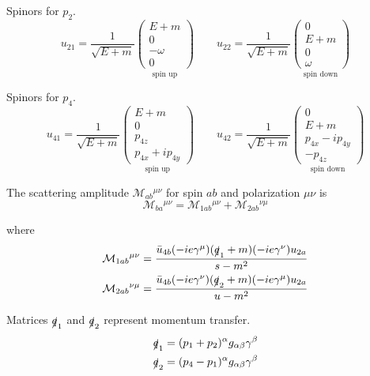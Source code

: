 Spinors for $p_2$.
\begin{equation*}
u_{21}=\frac{1}{\sqrt{E+m}}
\underset{\text{spin up}}
{\begin{pmatrix}
E+m\\
0\\
-\omega\\
0
\end{pmatrix}}
\qquad
u_{22}=\frac{1}{\sqrt{E+m}}
\underset{\text{spin down}}
{\begin{pmatrix}
0\\
E+m\\
0\\
\omega
\end{pmatrix}}
\end{equation*}

Spinors for $p_4$.
\begin{equation*}
u_{41}=\frac{1}{\sqrt{E+m}}
\underset{\text{spin up}}
{\begin{pmatrix}
E+m\\
0\\
p_{4z}\\
p_{4x}+ip_{4y}
\end{pmatrix}}
\qquad
u_{42}=\frac{1}{\sqrt{E+m}}
\underset{\text{spin down}}
{\begin{pmatrix}
0\\
E+m\\
p_{4x}-ip_{4y}\\
-p_{4z}
\end{pmatrix}}
\end{equation*}

The scattering amplitude $\mathcal M_{ab}{}^{\mu\nu}$
for spin $ab$ and polarization $\mu\nu$ is
\begin{equation*}
\mathcal M_{ba}{}^{\mu\nu}=\mathcal M_{1ab}{}^{\mu\nu}+\mathcal M_{2ab}{}^{\nu\mu}
\end{equation*}

where
\begin{align*}
\mathcal M_{1ab}{}^{\mu\nu}
&=\frac{\bar{u}_{4b}(-ie\gamma^\mu)(\slashed{q}_1+m)(-ie\gamma^\nu)u_{2a}}{s-m^2}
\\
\mathcal M_{2ab}{}^{\nu\mu}
&=\frac{\bar{u}_{4b}(-ie\gamma^\nu)(\slashed{q}_2+m)(-ie\gamma^\mu)u_{2a}}{u-m^2}
\end{align*}

Matrices $\slashed q_1$ and $\slashed q_2$ represent momentum transfer.
\begin{align*}
\slashed q_1&=(p_1+p_2)^\alpha g_{\alpha\beta}\gamma^\beta
\\
\slashed q_2&=(p_4-p_1)^\alpha g_{\alpha\beta}\gamma^\beta
\end{align*}

